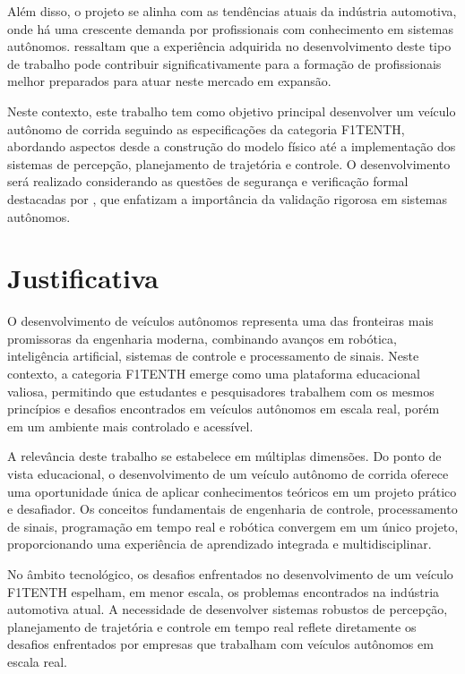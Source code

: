 Além disso, o projeto se alinha com as tendências atuais da indústria
automotiva, onde há uma crescente demanda por profissionais com conhecimento em
sistemas autônomos. \cite{Stachowicz2023FastRLAP} ressaltam que a experiência
adquirida no desenvolvimento deste tipo de trabalho pode contribuir
significativamente para a formação de profissionais melhor preparados para
atuar neste mercado em expansão.

Neste contexto, este trabalho tem como objetivo principal desenvolver um
veículo autônomo de corrida seguindo as especificações da categoria F1TENTH,
abordando aspectos desde a construção do modelo físico até a implementação dos
sistemas de percepção, planejamento de trajetória e controle. O desenvolvimento
será realizado considerando as questões de segurança e verificação formal
destacadas por \cite{Ivanov2020Verifying}, que enfatizam a importância da
validação rigorosa em sistemas autônomos.

\section*{Justificativa}\label{sec:Justificativa}

O desenvolvimento de veículos autônomos representa uma das fronteiras mais
promissoras da engenharia moderna, combinando avanços em robótica, inteligência
artificial, sistemas de controle e processamento de sinais. Neste contexto, a
categoria F1TENTH emerge como uma plataforma educacional valiosa, permitindo
que estudantes e pesquisadores trabalhem com os mesmos princípios e desafios
encontrados em veículos autônomos em escala real, porém em um ambiente mais
controlado e acessível.

A relevância deste trabalho se estabelece em múltiplas dimensões. Do ponto de
vista educacional, o desenvolvimento de um veículo autônomo de corrida oferece
uma oportunidade única de aplicar conhecimentos teóricos em um projeto prático
e desafiador. Os conceitos fundamentais de engenharia de controle,
processamento de sinais, programação em tempo real e robótica convergem em um
único projeto, proporcionando uma experiência de aprendizado integrada e
multidisciplinar.

No âmbito tecnológico, os desafios enfrentados no desenvolvimento de um veículo
F1TENTH espelham, em menor escala, os problemas encontrados na indústria
automotiva atual. A necessidade de desenvolver sistemas robustos de percepção,
planejamento de trajetória e controle em tempo real reflete diretamente os
desafios enfrentados por empresas que trabalham com veículos autônomos em
escala real.

